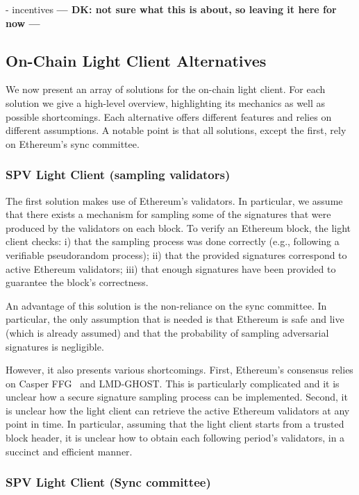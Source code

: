 - incentives \textbf{--- DK: not sure what this is about, so leaving it here for now ---}

\subsection{On-Chain Light Client Alternatives}\label{subsec:alternatives}

We now present an array of solutions for the on-chain light client. For each
solution we give a high-level overview, highlighting its mechanics as well as
possible shortcomings. Each alternative offers different features and relies on
different assumptions. A notable point is that all solutions, except the first,
rely on Ethereum's sync committee.

\subsubsection{SPV Light Client (sampling validators)}

The first solution makes use of Ethereum's validators. In particular, we assume
that there exists a mechanism for sampling some of the signatures that were
produced by the validators on each block. To verify an Ethereum block, the
light client checks:
i) that the sampling process was done correctly (e.g., following a verifiable pseudorandom process);
ii) that the provided signatures correspond to active Ethereum validators;
iii) that enough signatures have been provided to guarantee the block's correctness.

An advantage of this solution is the non-reliance on the sync committee. In
particular, the only assumption that is needed is that Ethereum is safe and
live (which is already assumed) and that the probability of sampling
adversarial signatures is negligible.

However, it also presents various shortcomings.
First, Ethereum's consensus relies on Casper FFG~\cite{buterin2017casper} and
LMD-GHOST. This is particularly complicated and it is unclear how a secure
signature sampling process can be implemented.
Second, it is unclear how the light client can retrieve the active Ethereum
validators at any point in time. In particular, assuming that the light client
starts from a trusted block header, it is unclear how to obtain each following
period's validators, in a succinct and efficient manner.

\subsubsection{SPV Light Client (Sync committee)}

